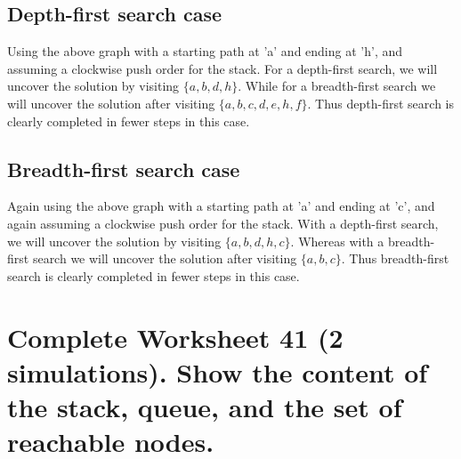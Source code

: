 \documentclass[letter,11pt]{scrartcl}
\begin{document}
\subsection[depthFirst]{Depth-first search case}

Using the above graph with a starting path at 'a' and ending at 'h', and
assuming a clockwise push order for the stack. For a depth-first search, we
will uncover the solution by visiting $\lbrace a,b,d,h\rbrace$. While for a
breadth-first search we will uncover the solution after visiting $\lbrace
a,b,c,d,e,h,f\rbrace$. Thus depth-first search is clearly completed in fewer
steps in this case.

\subsection[breadthFirst]{Breadth-first search case}

Again using the above graph with a starting path at 'a' and ending at 'c', and
again assuming a clockwise push order for the stack. With a depth-first
search, we will uncover the solution by visiting $\lbrace
a,b,d,h,c\rbrace$. Whereas with a breadth-first search we will uncover the
solution after visiting $\lbrace a,b,c\rbrace$. Thus breadth-first search is
clearly completed in fewer steps in this case.


\section[question_6]{Complete Worksheet 41 (2 simulations). Show the content
  of the stack, queue, and the set of reachable nodes.}
\end{document}
